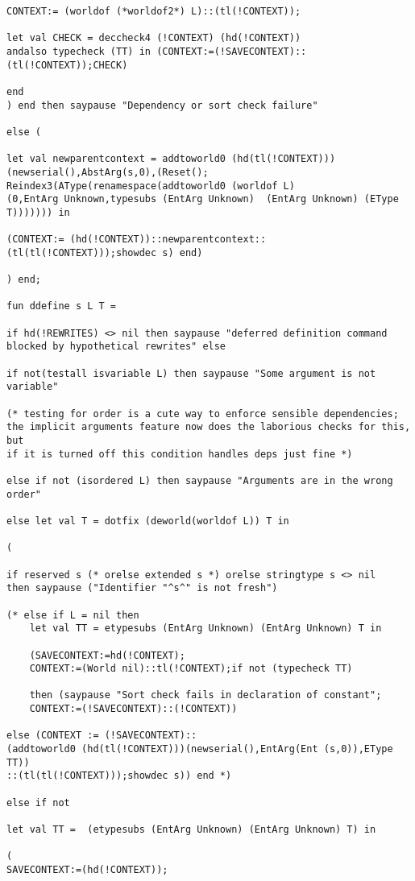 \documentclass{article}
\begin{document}
\begin{verbatim}
CONTEXT:= (worldof (*worldof2*) L)::(tl(!CONTEXT));

let val CHECK = deccheck4 (!CONTEXT) (hd(!CONTEXT)) 
andalso typecheck (TT) in (CONTEXT:=(!SAVECONTEXT)::(tl(!CONTEXT));CHECK) 

end
) end then saypause "Dependency or sort check failure"

else (

let val newparentcontext = addtoworld0 (hd(tl(!CONTEXT)))
(newserial(),AbstArg(s,0),(Reset();
Reindex3(AType(renamespace(addtoworld0 (worldof L) 
(0,EntArg Unknown,typesubs (EntArg Unknown)  (EntArg Unknown) (EType T))))))) in

(CONTEXT:= (hd(!CONTEXT))::newparentcontext::(tl(tl(!CONTEXT)));showdec s) end)

) end;

fun ddefine s L T = 

if hd(!REWRITES) <> nil then saypause "deferred definition command blocked by hypothetical rewrites" else

if not(testall isvariable L) then saypause "Some argument is not variable"

(* testing for order is a cute way to enforce sensible dependencies;
the implicit arguments feature now does the laborious checks for this, but
if it is turned off this condition handles deps just fine *)

else if not (isordered L) then saypause "Arguments are in the wrong order"

else let val T = dotfix (deworld(worldof L)) T in

(

if reserved s (* orelse extended s *) orelse stringtype s <> nil 
then saypause ("Identifier "^s^" is not fresh")

(* else if L = nil then 
    let val TT = etypesubs (EntArg Unknown) (EntArg Unknown) T in

    (SAVECONTEXT:=hd(!CONTEXT); 
    CONTEXT:=(World nil)::tl(!CONTEXT);if not (typecheck TT) 

    then (saypause "Sort check fails in declaration of constant";
    CONTEXT:=(!SAVECONTEXT)::(!CONTEXT))
   
else (CONTEXT := (!SAVECONTEXT)::
(addtoworld0 (hd(tl(!CONTEXT)))(newserial(),EntArg(Ent (s,0)),EType TT))
::(tl(tl(!CONTEXT)));showdec s)) end *)

else if not 

let val TT =  (etypesubs (EntArg Unknown) (EntArg Unknown) T) in

(
SAVECONTEXT:=(hd(!CONTEXT)); 


\end{verbatim}
\end{document}
